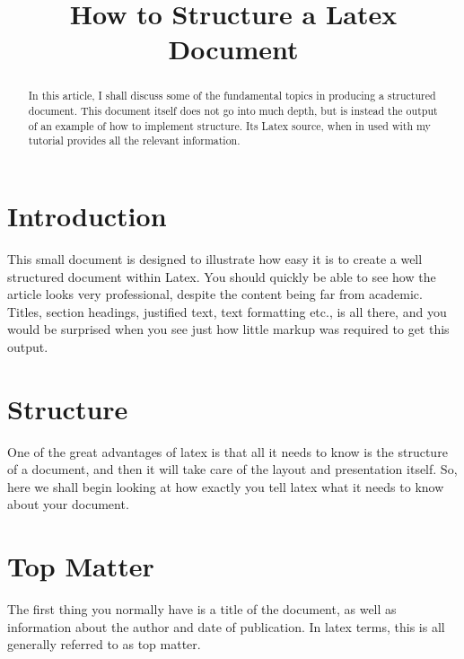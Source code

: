 
\title{How to Structure a Latex Document}

	\begin{abstract}
		In this article, I shall discuss some of the fundamental topics in
		producing a structured document.  This document itself does not go into
		much depth, but is instead the output of an example of how to implement
		structure. Its Latex source, when in used with my tutorial
		provides all the relevant information.  
	\end{abstract}
			
	\section{Introduction}
	This small document is designed to illustrate how easy it is to create a
	well structured document within Latex.  You should quickly be able to
	see how the article looks very professional, despite the content being
	far from academic.  Titles, section headings, justified text, text
	formatting etc., is all there, and you would be surprised when you see
	just how little markup was required to get this output.
	
	\section{Structure}
	One of the great advantages of latex is that all it needs to know is
	the structure of a document, and then it will take care of the layout
	and presentation itself.  So, here we shall begin looking at how exactly
	you tell latex what it needs to know about your document.
	
	\section{Top Matter}
	The first thing you normally have is a title of the document, as well as
	information about the author and date of publication. In latex terms,
	this is all generally referred to as top matter.
		
